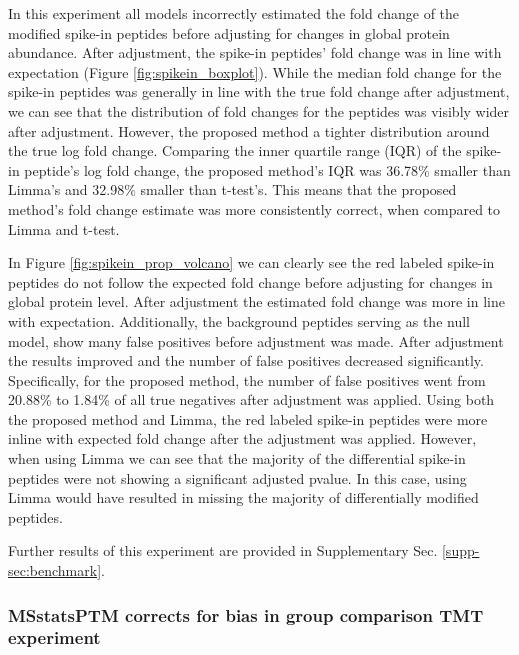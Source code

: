 \documentclass[mcp]{article}
\numberwithin{table}{section}
\begin{document}
In this experiment all models incorrectly estimated the fold change of the modified spike-in peptides before adjusting for changes in global protein abundance. After adjustment, the spike-in peptides' fold change was in line with expectation (Figure \ref{fig:spikein_boxplot}). While the median fold change for the spike-in peptides was generally in line with the true fold change after adjustment, we can see that the distribution of fold changes for the peptides was visibly wider after adjustment. However, the proposed method a tighter distribution around the true log fold change. Comparing the inner quartile range (IQR) of the spike-in peptide's log fold change, the proposed method's IQR was 36.78\% smaller than Limma's and 32.98\% smaller than t-test's. This means that the proposed method's fold change estimate was more consistently correct, when compared to Limma and t-test.

In Figure \ref{fig:spikein_prop_volcano} we can clearly see the red labeled spike-in peptides do not follow the expected fold change before adjusting for changes in global protein level. After adjustment the estimated fold change was more in line with expectation. Additionally, the background peptides serving as the null model, show many false positives before adjustment was made. After adjustment the results improved and the number of false positives decreased significantly. Specifically, for the proposed method, the number of false positives went from 20.88\% to 1.84\% of all true negatives after adjustment was applied. Using both the proposed method and Limma, the red labeled spike-in peptides were more inline with expected fold change after the adjustment was applied. However, when using Limma we can see that the majority of the differential spike-in peptides were not showing a significant adjusted pvalue. In this case, using Limma would have resulted in missing the majority of differentially modified peptides.

Further results of this experiment are provided in Supplementary Sec. \ref{supp-sec:benchmark}. 

\subsubsection*{MSstatsPTM corrects for bias in group comparison TMT experiment}
\end{document}
